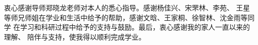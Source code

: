 \begin{acknowledgements}
衷心感谢导师郑晓龙老师对本人的悉心指导。感谢杨佳兴、宋罘林、李苑、
王星等师兄师姐在学业和生活中给予的帮助，感谢文晗、王家桐、徐智林、沈金雨等同学
在学习和科研过程中给予的支持与鼓励。最后，衷心感谢我的家人一直以来的理解、
陪伴与支持，使我得以顺利完成学业。

\end{acknowledgements}
